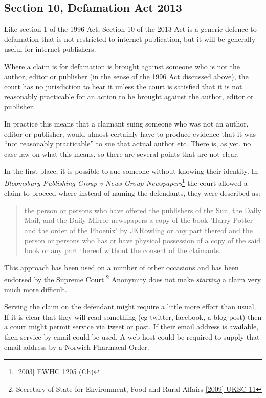 \documentclass[]{article}
\begin{document}
\subsection{Section 10, Defamation Act 2013}
Like section 1 of the 1996 Act, Section 10 of the 2013 Act is a generic defence to defamation that is not restricted to internet publication, but it will be generally useful for internet publishers.

Where a claim is for defamation is brought against someone who is not the author, editor or publisher (in the sense of the 1996 Act discussed above), the court has no jurisdiction to hear it unless the court is satisfied that it is not reasonably practicable for an action to be brought against the author, editor or publisher.

In practice this means that a claimant suing someone who was not an author, editor or publisher, would almost certainly have to produce evidence that it was ``not reasonably practicable'' to sue that actual author etc. There is, as yet, no case law on what this means, so there are several points that are not clear.

In the first place, it is possible to sue someone without knowing their identity. In {\it Bloomsbury Publishing Group v News Group Newspapers}\footnote{\href{http://www.bailii.org/ew/cases/EWHC/Ch/2003/1205.html}{[2003] EWHC 1205 (Ch)}} the court allowed a claim to proceed where instead of naming the defendants, they were described as:

\begin{quote}
  the person or persons who have offered the publishers of the Sun, the Daily Mail, and the Daily Mirror newspapers a copy of the book 'Harry Potter and the order of the Phoenix' by JKRowling or any part thereof and the person or persons who has or have physical possession of a copy of the said book or any part thereof without the consent of the claimants.
\end{quote}

This approach has been used on a number of other occasions and has been endorsed by the Supreme Court.\footnote{Secretary of State for Environment, Food and Rural Affairs \href{http://www.bailii.org/uk/cases/UKSC/2009/11.html}{[2009] UKSC 11}} Anonymity does not make {\it starting} a claim very much more difficult. 

Serving the claim on the defendant might require a little more effort than usual. If it is clear that they will read something (eg twitter, facebook, a blog post) then a court might permit service via tweet or post. If their email address is available, then service by email could be used. A web host could be required to supply that email address by a Norwich Pharmacal Order.
\end{document}
